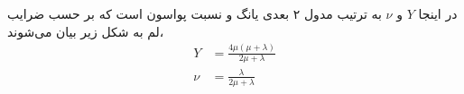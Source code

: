 در اینجا $Y$
و $\nu$
به ترتیب مدول ۲ بعدی یانگ
 و نسبت پواسون
است که بر حسب ضرایب لم به شکل زیر بیان می‌شوند،
\begin{equation}
\begin{aligned}
Y&=\frac{4\mu(\mu+\lambda)}{2\mu+\lambda}\\
\nu&=\frac{\lambda}{2\mu+\lambda}
\label{eq:younglame}
\end{aligned}
\end{equation}

 
 
 
 
 
 
